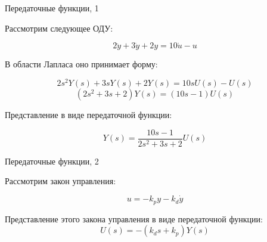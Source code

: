 \documentclass{beamer}
\begin{document}
\begin{frame}{Передаточные функции, 1}
	\begin{flushleft}
		
		Рассмотрим следующее ОДУ:
		
		\begin{equation}
			2 \ddot y + 3 \dot y + 2 y = 10 \dot u - u
		\end{equation}
		
		В области Лапласа оно принимает форму:
		
		\begin{equation}
			2 s^2 Y(s) + 3s Y(s) + 2Y(s) = 10s U(s) - U(s)
		\end{equation}
		\begin{equation}
			(2s^2 + 3s + 2) Y(s) = (10s - 1)U(s)
		\end{equation}
		
		Представление в виде передаточной функции: 
		
		\begin{equation}
			Y(s) = \frac{10s - 1}{2s^2 + 3s + 2} U(s)
		\end{equation}
		
	\end{flushleft}
\end{frame}




\begin{frame}{Передаточные функции, 2}
	\begin{flushleft}
		
		Рассмотрим закон управления:
		
		\begin{equation}
			u = -k_p y - k_d \dot y
		\end{equation}
		
		Представление этого закона управления в виде передаточной функции:
		\begin{equation}
			U(s) = -(k_d s + k_p) Y(s)
		\end{equation}
		
	\end{flushleft}
\end{frame}
\end{document}
